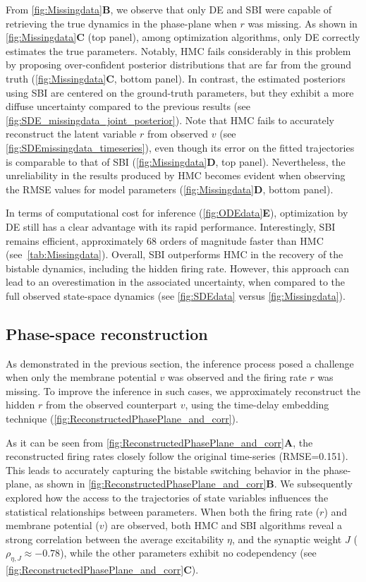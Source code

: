 \documentclass[12pt]{article}
\begin{document}
From \autoref{fig:Missingdata}\textbf{B}, we observe that only DE and SBI were capable of retrieving the true dynamics in the phase-plane when $r$ was missing. As shown in \autoref{fig:Missingdata}\textbf{C} (top panel), among optimization algorithms, only DE correctly estimates the true parameters. Notably, HMC fails considerably in this problem by proposing over-confident posterior distributions that are far from the ground truth (\autoref{fig:Missingdata}\textbf{C}, bottom panel). In contrast, the estimated posteriors using SBI are centered on the ground-truth parameters, but they exhibit a more diffuse uncertainty compared to the previous results (see \autoref{fig:SDE_missingdata_joint_posterior}).
Note that HMC fails to accurately reconstruct the latent variable $r$ from observed $v$ (see \autoref{fig:SDEmissingdata_timeseries}), even though its error on the fitted trajectories is comparable to that of SBI (\autoref{fig:Missingdata}\textbf{D}, top panel). Nevertheless, the unreliability in the results produced by HMC becomes evident when observing the RMSE values for model parameters (\autoref{fig:Missingdata}\textbf{D}, bottom panel). 

In terms of computational cost for inference (\autoref{fig:ODEdata}\textbf{E}), optimization by DE still has a clear advantage with its rapid performance.
Interestingly, SBI remains efficient, approximately 68 orders of magnitude faster than HMC (see~\autoref{tab:Missingdata}). Overall, SBI outperforms HMC in the recovery of the bistable dynamics, including the hidden firing rate.  However, this approach can lead to an overestimation in the associated uncertainty, when compared to the full observed state-space dynamics (see \autoref{fig:SDEdata} versus \autoref{fig:Missingdata}).


\subsection{Phase-space reconstruction}

As demonstrated in the previous section, the inference process posed a challenge when only the membrane potential $v$ was observed and the firing rate $r$ was missing. To improve the inference in such cases, we approximately reconstruct the hidden $r$ from the observed counterpart $v$, using the time-delay embedding technique (\autoref{fig:ReconstructedPhasePlane_and_corr}). 

As it can be seen from \autoref{fig:ReconstructedPhasePlane_and_corr}\textbf{A}, the reconstructed firing rates closely follow the original time-series (RMSE=0.151). This leads to accurately capturing the bistable switching behavior in the phase-plane, as shown in \autoref{fig:ReconstructedPhasePlane_and_corr}\textbf{B}. We subsequently explored how the access to the trajectories of state variables influences the statistical relationships between parameters. When both the firing rate ($r$) and membrane potential ($v$) are observed, both HMC and SBI algorithms reveal a strong correlation between the average excitability $\eta$, and the synaptic weight $J$ ($\rho_{\eta, J} \approx -0.78$), while the other parameters exhibit no codependency (see \autoref{fig:ReconstructedPhasePlane_and_corr}\textbf{C}). 
\end{document}
